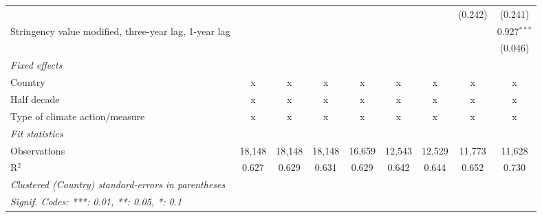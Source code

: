 \begin{table}[htbp]
\begin{tabular}{lcccccccc}
                                                                                                 &                &              &               &               &               &               & (0.242)       & (0.241)\\   
      Stringency value modified, three-year lag, 1-year lag                                      &                &              &               &               &               &               &               & 0.927$^{***}$\\   
                                                                                                 &                &              &               &               &               &               &               & (0.046)\\   
      \emph{Fixed effects}\\
      Country                                                                                    & x              & x            & x             & x             & x             & x             & x             & x\\  
      Half decade                                                                                & x              & x            & x             & x             & x             & x             & x             & x\\  
      Type of climate action/measure                                                             & x              & x            & x             & x             & x             & x             & x             & x\\  
      \midrule \emph{Fit statistics}\\
      Observations                                                                               & 18,148         & 18,148       & 18,148        & 16,659        & 12,543        & 12,529        & 11,773        & 11,628\\  
      R$^2$                                                                                      & 0.627          & 0.629        & 0.631         & 0.629         & 0.642         & 0.644         & 0.652         & 0.730\\  
      \midrule
      \multicolumn{9}{l}{\emph{Clustered (Country) standard-errors in parentheses}}\\
      \multicolumn{9}{l}{\emph{Signif. Codes: ***: 0.01, **: 0.05, *: 0.1}}\\
   \end{tabular}
\end{table}


